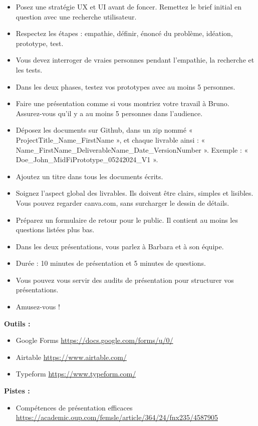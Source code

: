 \begin{itemize}
\item Posez une stratégie UX et UI avant de foncer. Remettez le brief initial en question avec une recherche utilisateur.
\item Respectez les étapes : empathie, définir, énoncé du problème, idéation, prototype, test.
\item Vous devez interroger de vraies personnes pendant l'empathie, la recherche et les tests.
\item Dans les deux phases, testez vos prototypes avec au moins 5 personnes.
\item Faire une présentation comme si vous montriez votre travail à Bruno. Assurez-vous qu'il y a au moins 5 personnes dans l'audience.
\item Déposez les documents sur Github, dans un zip nommé « ProjectTitle\_Name\_FirstName », et chaque livrable ainsi : « Name\_FirstName\_DeliverableName\_Date\_VersionNumber ». Exemple : « Doe\_John\_MidFiPrototype\_05242024\_V1 ».
\item Ajoutez un titre dans tous les documents écrits.
\item Soignez l'aspect global des livrables. Ils doivent être clairs, simples et lisibles. Vous pouvez regarder canva.com, sans surcharger le dessin de détails.
\item Préparez un formulaire de retour pour le public. Il contient au moins les questions listées plus bas.
\item Dans les deux présentations, vous parlez à Barbara et à son équipe.
\item Durée : 10 minutes de présentation et 5 minutes de questions.
\item Vous pouvez vous servir des audits de présentation pour structurer vos présentations.
\item Amusez-vous !
\end{itemize}

\textbf{Outils :}

\begin{itemize}
\item Google Forms \url{https://docs.google.com/forms/u/0/}
\item Airtable \url{https://www.airtable.com/}
\item Typeform \url{https://www.typeform.com/}
\end{itemize}

\textbf{Pistes :}

\begin{itemize}
\item Compétences de présentation efficaces \url{https://academic.oup.com/femsle/article/364/24/fnx235/4587905}
\end{itemize}

